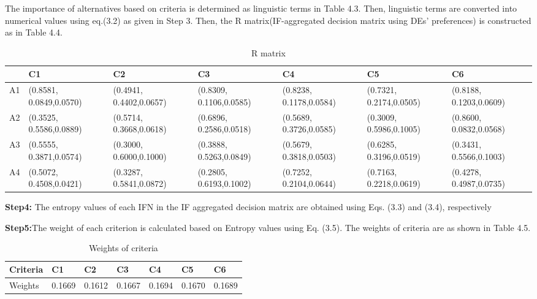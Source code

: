 \begin{flushleft}
\newline
The importance of alternatives based on criteria is
determined as linguistic terms in Table 4.3. Then, linguistic
terms are converted into numerical values using eq.(3.2) as given in Step 3.
Then, the R matrix(IF-aggregated decision matrix using DEs’
preferences) is constructed as in Table 4.4.

\vspace{3mm}


\renewcommand{\arraystretch}{1}
\begin{table}[h!]
    \centering
  
\caption{R matrix}
  \begin{tabular}{ p{1cm}  p{2cm} p{2cm} p{2cm} p{2cm} p{2cm} p{2cm} }
  \hline
   & C1 & C2 & C3 & C4 & C5 & C6 \\
 \hline
 

A1 & (0.8581, 0.0849,0.0570)&(0.4941, 0.4402,0.0657)&(0.8309, 0.1106,0.0585)&(0.8238, 0.1178,0.0584)&(0.7321, 0.2174,0.0505)&(0.8188, 0.1203,0.0609)\\
A2 & (0.3525, 0.5586,0.0889)&(0.5714, 0.3668,0.0618)&(0.6896, 0.2586,0.0518)&(0.5689, 0.3726,0.0585)&(0.3009, 0.5986,0.1005)&(0.8600, 0.0832,0.0568)\\
A3 & (0.5555, 0.3871,0.0574)&(0.3000, 0.6000,0.1000)&(0.3888, 0.5263,0.0849)&(0.5679, 0.3818,0.0503)&(0.6285, 0.3196,0.0519)&(0.3431, 0.5566,0.1003)\\
A4 & (0.5072, 0.4508,0.0421)&(0.3287, 0.5841,0.0872)&(0.2805, 0.6193,0.1002)
&(0.7252, 0.2104,0.0644)&(0.7163, 0.2218,0.0619)&(0.4278, 0.4987,0.0735)\\
  \hline
 \end{tabular}
 
\label{table:2}
\end{table}
\textbf{Step4:}  The entropy values of each IFN in the
IF aggregated decision matrix are obtained using Eqs. (3.3) and (3.4),
respectively

\vspace{3mm}

\textbf{Step5:}The weight of each criterion is calculated based on
Entropy values using Eq. (3.5). The weights of criteria are as shown
in Table 4.5.
\vspace{3mm}

\renewcommand{\arraystretch}{1}
\begin{table}[h!]
    \centering
   \caption{Weights of criteria}

  \begin{tabular}{ |p{1.5cm}|  p{1.5cm} p{1.5cm} p{1.5cm} p{1.5cm} p{1.5cm} p{1.5cm}| }
  \hline
   Criteria & C1 & C2 & C3 & C4 & C5 & C6 \\
   \hline
   Weights &0.1669 &0.1612 & 0.1667& 0.1694 &0.1670& 0.1689\\
 

\end{tabular}
\end{table}
\end{flushleft}
